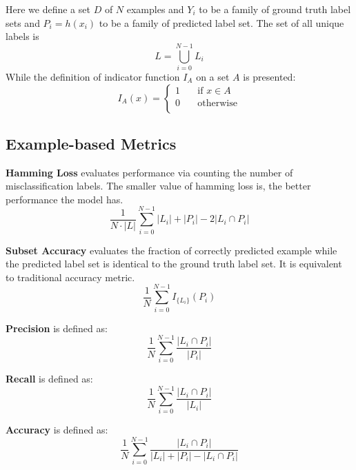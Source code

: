 Here we define a set $D$ of $N$ examples and $Y_{i}$ to be a family of ground truth label sets and $P_{i} = h(x_{i})$ to be a family of predicted label set. The set of all unique labels is
\begin{equation}\label{eq:UniLabel}
L = \bigcup_{i=0}^{N-1} L_{i}
\end{equation}
While the definition of indicator function $I_{A}$ on a set $A$ is presented:
\begin{equation}\label{eq:IndicatorFunc}
I_{A}(x) =
  \begin{cases}
    1       & \quad \text{if } x \in A\\
    0  & \quad \text{otherwise}\\
  \end{cases}
\end{equation}

\subsection{Example-based Metrics}

\textbf{Hamming Loss} evaluates performance via counting the number of misclassification labels. The smaller value of hamming loss is, the better performance the model has.
\begin{equation}\label{eq:HammingLoss}
\frac{1}{N \cdot \left|L\right|} \sum_{i=0}^{N - 1} \left|L_i\right| + \left|P_i\right| - 2\left|L_i
          \cap P_i\right|
\end{equation}

\textbf{Subset Accuracy} evaluates the fraction of correctly predicted example while the predicted label set is identical to the ground truth label set. It is equivalent to traditional accuracy metric.
\begin{equation}\label{eq:SubsetAcu}
\frac{1}{N} \sum_{i=0}^{N-1} I_{\{L_i\}}(P_i)
\end{equation}

\textbf{Precision} is defined as:
\begin{equation}\label{eq:Precision}
\frac{1}{N} \sum_{i=0}^{N-1} \frac{\left|L_i \cap P_i\right|}{\left|P_i\right|}
\end{equation}

\textbf{Recall} is defined as:
\begin{equation}\label{eq:Recall}
\frac{1}{N} \sum_{i=0}^{N-1} \frac{\left|L_i \cap P_i\right|}{\left|L_i\right|}
\end{equation}

\textbf{Accuracy} is defined as:
\begin{equation}\label{eq:Accuracy}
\frac{1}{N} \sum_{i=0}^{N - 1} \frac{\left|L_i \cap P_i \right|}
        {\left|L_i\right| + \left|P_i\right| - \left|L_i \cap P_i \right|}
\end{equation}

